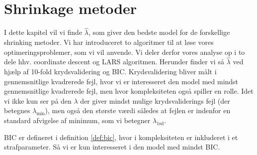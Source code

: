 \chapter{Shrinkage metoder}
I dette kapitel vil vi finde $\widehat\lambda$, som giver den bedste model for de forskellige shrinking metoder. 
Vi har introduceret to algoritmer til at løse vores optimeringsproblemer, som vi vil anvende.
Vi deler derfor vores analyse op i to dele  hhv. coordinate descent og LARS algoritmen.
Herunder finder vi så  $\widehat\lambda$ ved hjælp af 10-fold krydsvalidering og BIC. 
Krydsvalidering bliver målt  i gennemsnitlige kvadrerede fejl, hvor vi er interesseret den model med mindst gennemsnitlige kvadrerede fejl, men hvor kompleksiteten også spiller en rolle.
Idet vi ikke kun ser på den $\lambda$ der giver mindst mulige krydsvaliderings fejl (der betegnes $\lambda_{\min}$), men også den største værdi således at fejlen er indenfor en standard afvigelse af minimum, som vi betegner $\lambda_{\text{1sd}}$.  

BIC er defineret i definition \ref{def:bic}, hvor i kompleksiteten er inkluderet i et strafparameter. Så vi er kun interesseret i den model med mindst BIC. 





